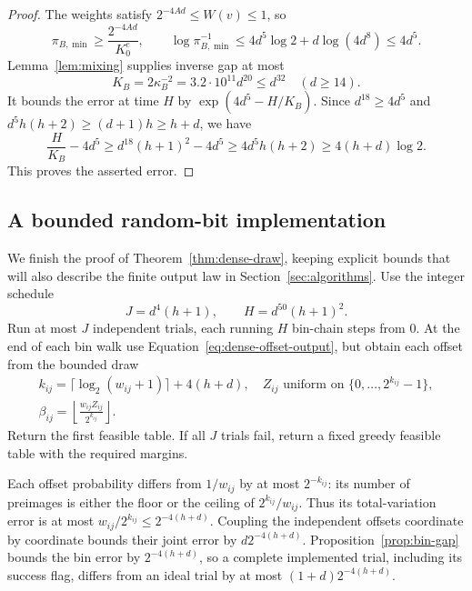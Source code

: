 \begin{proof}
The weights satisfy $2^{-4Ad}\le W(v)\le1$, so
\[
 \pi_{B,\min}\ge\frac{2^{-4Ad}}{K_0^e},\qquad
 \log\pi_{B,\min}^{-1}\le4d^5\log2+d\log(4d^8)\le4d^5.
\]
Lemma~\ref{lem:mixing} supplies inverse gap at most
\[
 K_B=2\kappa_B^{-2}=3.2\cdot10^{11}d^{20}\le d^{32}
 \quad(d\ge14).
\]
It bounds the error at time $H$ by
$\exp(4d^5-H/K_B)$.  Since $d^{18}\ge4d^5$ and
$d^5h(h+2)\ge(d+1)h\ge h+d$, we have
\[
 \frac H{K_B}-4d^5\ge d^{18}(h+1)^2-4d^5
 \ge4d^5h(h+2)\ge4(h+d)\log2.
\]
This proves the asserted error.
\end{proof}

\subsection{A bounded random-bit implementation}

We finish the proof of Theorem~\ref{thm:dense-draw}, keeping explicit
bounds that will also describe the finite output law in
Section~\ref{sec:algorithms}.  Use the integer schedule
\begin{equation}\label{eq:dense-schedule}
 J=d^4(h+1),\qquad H=d^{50}(h+1)^2.
\end{equation}
Run at most $J$ independent trials, each running $H$ bin-chain steps from $0$.
At the end of each bin walk use Equation~\eqref{eq:dense-offset-output},
but obtain each offset from the bounded draw
\begin{equation}\label{eq:dense-offset-bits}
 \begin{gathered}
 k_{ij}=\lceil\log_2(w_{ij}+1)\rceil+4(h+d),\quad
 Z_{ij}\text{ uniform on }\{0,\ldots,2^{k_{ij}}-1\},\\
 \beta_{ij}=\left\lfloor\frac{w_{ij}Z_{ij}}{2^{k_{ij}}}\right\rfloor.
 \end{gathered}
\end{equation}
Return the first feasible table.  If all $J$ trials fail, return a fixed
greedy feasible table with the required margins.

Each offset probability differs from $1/w_{ij}$ by at most $2^{-k_{ij}}$:
its number of preimages is either the floor or the ceiling of
$2^{k_{ij}}/w_{ij}$.  Thus its total-variation error is at most
$w_{ij}/2^{k_{ij}}\le2^{-4(h+d)}$.  Coupling the independent offsets
coordinate by coordinate bounds their joint error by
$d2^{-4(h+d)}$.  Proposition~\ref{prop:bin-gap} bounds the bin error by
$2^{-4(h+d)}$, so a complete implemented trial, including its success
flag, differs from an ideal trial by at most
$(1+d)2^{-4(h+d)}$.

